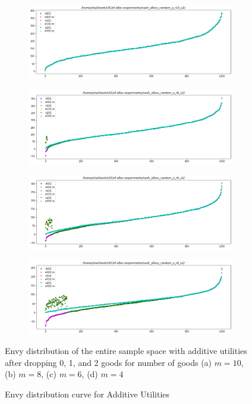 \begin{figure}[h!]
  \centering
  \begin{subfigure}[b]{0.47\linewidth}
    \includegraphics[width=\linewidth]{images/add/pdf_additive_10.png}
    \caption{}
  \end{subfigure}
  \begin{subfigure}[b]{0.47\linewidth}
    \includegraphics[width=\linewidth]{images/add/pdf_additive_8.png}
    \caption{}
  \end{subfigure}
  \begin{subfigure}[b]{0.47\linewidth}
    \includegraphics[width=\linewidth]{images/add/pdf_additive_6.png}
    \caption{}
  \end{subfigure}
  \begin{subfigure}[b]{0.47\linewidth}
    \includegraphics[width=\linewidth]{images/add/pdf_additive_4.png}
    \caption{}
  \end{subfigure}
  \caption{Envy distribution curve for Additive Utilities}
  \label{fig_efk_dist_curve_add}
  \small
    Envy distribution of the entire sample space with additive utilities after dropping 0, 1, and 2 goods for number of goods (a) $m = 10$, (b) $m = 8$, (c) $m = 6$, (d) $m = 4$
\end{figure}

